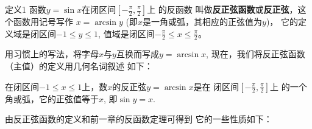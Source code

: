 \begin{blk}{定义1}
    函数$y=\sin x$在闭区间$\left[-\frac{\pi}{2},\frac{\pi}{2}\right]$上
的反函数
叫做\textbf{反正弦函数}或\textbf{反正弦}，这个函数用记号写作
$x=\arcsin y$ (即$x$是一角或弧，其相应的正弦值为$y$)，
它的定义域是闭区间$-1\le y\le 1$, 值域是闭区间$-\frac{\pi}{2}\le x\le \frac{\pi}{2}$。
\end{blk}

用习惯上的写法，将字母$x$与$y$互换而写成$y=\arcsin x$,
现在，我们将反正弦函数（主值）的定义用几何名词叙述
如下：

在闭区间$-1\le x\le 1$上，数$x$的反正弦$y=\arcsin x$是在
闭区间$\left[-\frac{\pi}{2},\frac{\pi}{2}\right]$上
的一个角或弧，它的正弦值等于$x$, 
即$\sin y=x$.

由反正弦函数的定义和前一章的反函数定理可得到
它的一些性质如下：





















































































